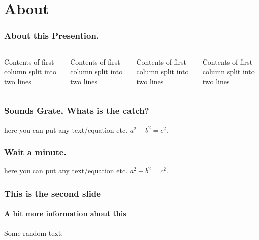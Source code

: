 \documentclass{beamer}
\begin{document}
     \section{About}
	\begin{frame}
	  \frametitle{ About this Presention.  }
	   \begin{columns}[T] %
     \begin{column}{.23\textwidth} %
     Contents of first column \newline split into two lines
     \end{column}
     \begin{column}{.23\textwidth} %
     Contents of first column \newline split into two lines
     \end{column}
     \begin{column}{.23\textwidth} %
     Contents of first column \newline split into two lines
     \end{column}
     \begin{column}{.23\textwidth} %
     Contents of first column \newline split into two lines
     \end{column}
     \end{columns}
	\end{frame}
	\begin{frame}
	  \frametitle{ Sounds Grate, Whats is the catch? }
		here you can put any text/equation etc. 
		$a^2 + b^2 = c^2$.		
	\end{frame}\begin{frame}
	  \frametitle{ Wait a minute. }
		here you can put any text/equation etc. 
		$a^2 + b^2 = c^2$.		
	\end{frame}
	\begin{frame}
		\frametitle{This is the second slide}
		\framesubtitle{A bit more information about this}
		Some random text.		
	\end{frame}
\end{document}
